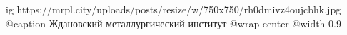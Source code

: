  
 
 
 
 

\ifcmt
  ig https://mrpl.city/uploads/posts/resize/w/750x750/rh0dmivz4oujcbhk.jpg
	@caption Ждановский металлургический институт
  @wrap center
  @width 0.9
\fi
